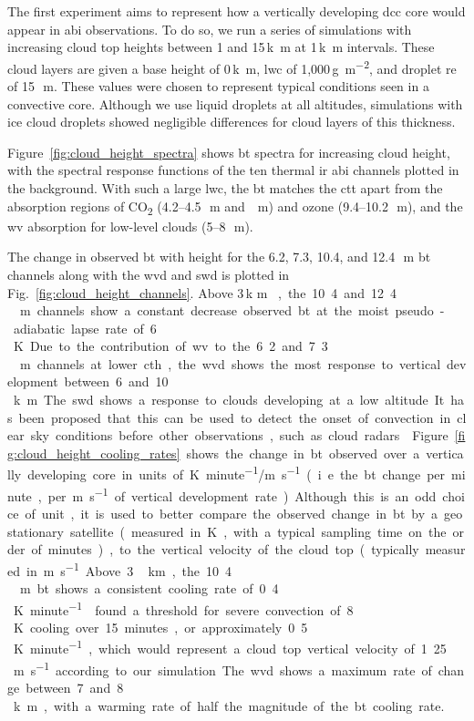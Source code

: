 The first experiment aims to represent how a vertically developing \acrshort{dcc} core would appear in \acrshort{abi} observations.
To do so, we run a series of simulations with increasing cloud top heights between 1 and 15\,\unit{k m} at 1\,\unit{k m} intervals.
These cloud layers are given a base height of 0\,\unit{k m}, \acrshort{lwc} of 1,000\,\unit{g m^{-2}}, and droplet \acrshort{re} of 15\,\unit{\mu m}.
These values were chosen to represent typical conditions seen in a convective core.
Although we use liquid droplets at all altitudes, simulations with ice cloud droplets showed negligible differences for cloud layers of this thickness.

Figure~\ref{fig:cloud_height_spectra} shows \acrshort{bt} spectra for increasing cloud height, with the spectral response functions of the ten thermal \acrshort{ir} \acrshort{abi} channels plotted in the background.
With such a large \acrshort{lwc}, the \acrshort{bt} matches the \acrshort{ctt} apart from the absorption regions of CO\textsubscript{2} (4.2--4.5\,\unit{\mu m} and \,\unit{\mu m}) and ozone (9.4--10.2\,\unit{\mu m}), and the \acrshort{wv} absorption for low-level clouds (5--8\,\unit{\mu m}).

The change in observed \acrshort{bt} with height for the 6.2, 7.3, 10.4, and 12.4\,\unit{\mu m} \acrshort{bt} channels along with the \acrshort{wvd} and \acrshort{swd} is plotted in Fig.~\ref{fig:cloud_height_channels}. 
Above 3\,\unit{k m }, the 10.4 and 12.4\,\unit{\mu m} channels show a constant decrease observed \acrshort{bt} at the moist pseudo-adiabatic lapse rate of 6\,\unit{K}.
Due to the contribution of \acrshort{wv} to the 6.2 and 7.3\,\unit{\mu m} channels at lower \acrshort{cth}, the \acrshort{wvd} shows the most response to vertical development between 6 and 10\,\unit{k m}.
The \acrshort{swd} shows a response to clouds developing at a low altitude.
It has been proposed that this can be used to detect the onset of convection in clear sky conditions before other observations, such as cloud radars \citep{lindsey_use_2014, lindsey_using_2018}.

Figure~\ref{fig:cloud_height_cooling_rates} shows the change in \acrshort{bt} observed over a vertically developing core in units of \unit{K minute^{-1}/m s^{-1}} (i.e. the \acrshort{bt} change per minute, per \unit{m s^{-1}} of vertical development rate).
Although this is an odd choice of unit, it is used to better compare the observed change in \acrshort{bt} by a geostationary satellite (measured in \unit{K}, with a typical sampling time on the order of minutes), to the vertical velocity of the cloud top (typically measured in \unit{m s^{-1}}.
Above 3\,\unit{km}, the 10.4\,\unit{\mu m} \acrshort{bt} shows a consistent cooling rate of 0.4\,\unit{K minute^{-1}}.
\citet{roberts_nowcasting_2003} found a threshold for severe convection of 8\,\unit{K} cooling over 15~minutes, or approximately 0.5\,\unit{K minute^{-1}}, which would represent a cloud top vertical velocity of 1.25\,\unit{m s^{-1}} according to our simulation.
The \acrshort{wvd} shows a maximum rate of change between 7 and 8\,\unit{k m}, with a warming rate of half the magnitude of the \acrshort{bt} cooling rate.

